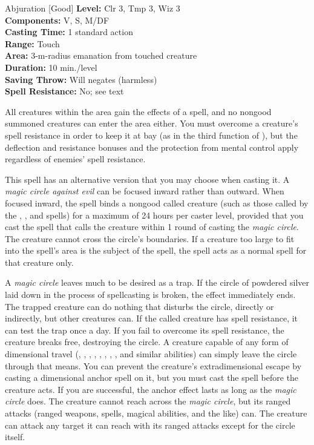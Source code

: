 {Abjuration [Good]}
{
	\textbf{Level:}
	Clr 3, Tmp 3, Wiz 3\\
	\textbf{Components:}
	V, S, M/DF\\
	\textbf{Casting Time:}
	1 standard action\\
	\textbf{Range:}
	Touch\\
	\textbf{Area:}
	3-m-radius emanation from touched creature\\
	\textbf{Duration:}
	10 min./level\\
	\textbf{Saving Throw:}
	Will negates (harmless)\\
	\textbf{Spell Resistance:}
	No; see text\\
}
{
	All creatures within the area gain the effects of a  spell, and no nongood summoned creatures can enter the area either. You must overcome a creature's spell resistance in order to keep it at bay (as in the third function of ), but the deflection and resistance bonuses and the protection from mental control apply regardless of enemies' spell resistance.

	This spell has an alternative version that you may choose when casting it. A \emph{magic circle against evil} can be focused inward rather than outward. When focused inward, the spell binds a nongood called creature (such as those called by the , , and  spells) for a maximum of 24 hours per caster level, provided that you cast the spell that calls the creature within 1 round of casting the \emph{magic circle}. The creature cannot cross the circle's boundaries. If a creature too large to fit into the spell's area is the subject of the spell, the spell acts as a normal  spell for that creature only.

	A \emph{magic circle} leaves much to be desired as a trap. If the circle of powdered silver laid down in the process of spellcasting is broken, the effect immediately ends. The trapped creature can do nothing that disturbs the circle, directly or indirectly, but other creatures can. If the called creature has spell resistance, it can test the trap once a day. If you fail to overcome its spell resistance, the creature breaks free, destroying the circle. A creature capable of any form of dimensional travel (, , , , , , , , and similar abilities) can simply leave the circle through that means. You can prevent the creature's extradimensional escape by casting a dimensional anchor spell on it, but you must cast the spell before the creature acts. If you are successful, the anchor effect lasts as long as the \emph{magic circle} does. The creature cannot reach across the \emph{magic circle}, but its ranged attacks (ranged weapons, spells, magical abilities, and the like) can. The creature can attack any target it can reach with its ranged attacks except for the circle itself.

}
